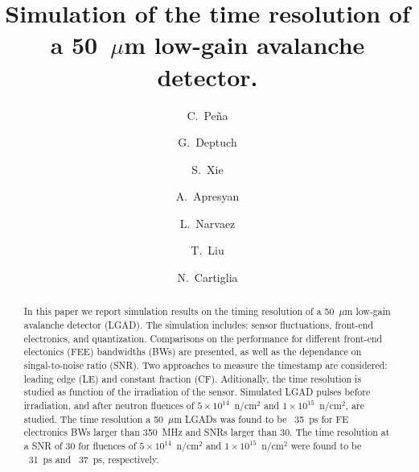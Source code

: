 \documentclass[preprint,1p]{elsarticle}
\begin{document}
\linenumbers

\begin{frontmatter}



\title{Simulation of the time resolution of a 50~$\mu$m low-gain avalanche detector.}


\author[1,2]{C.~Pe\~na}
\author[1]{G.~Deptuch}
\author[2]{S.~Xie}
\author[1]{A.~Apresyan}
\author[2]{L.~Narvaez}
\author[1]{T.~Liu}
\author[3]{N.~Cartiglia}


\address[1]{Fermi National Accelerator Laboratory, Batavia, IL, USA}
\address[2]{California Institute of Technology, Pasadena, CA, USA}
\address[3]{INFN, Torino, Italy}

\begin{abstract}
In this paper we report simulation results on the timing resolution of a 50~$\mu$m low-gain avalanche detector (LGAD).
The simulation includes: sensor fluctuations, front-end electronics, and quantization.
Comparisons on the performance for different front-end electonics (FEE) bandwidths (BWs) are presented, as well as
the dependance on singal-to-noise ratio (SNR).
Two approaches to measure the timestamp are considered: leading edge (LE) and constant fraction (CF).
Aditionally, the time resolution is studied as function of the irradiation of the sensor.
Simulated LGAD pulses before irradiation, and after neutron fluences of
 $5\times 10^{14}$~n/cm$^2$ and $1\times 10^{15}$~n/cm$^2$, are studied.
 The time resolution a 50~$\mu$m LGADs was found to be ~35~\si{ps} for FE electronics BWs larger than 350~\si{MHz} and SNRs larger than 30.
 The time resolution at a SNR of 30 for fluences of $5\times 10^{14}$~n/cm$^2$ and $1\times 10^{15}$~n/cm$^2$ were found to be ~31~\si{ps}
  and ~37~\si{ps}, respectively.
\end{abstract}


\end{frontmatter}
\end{document}
